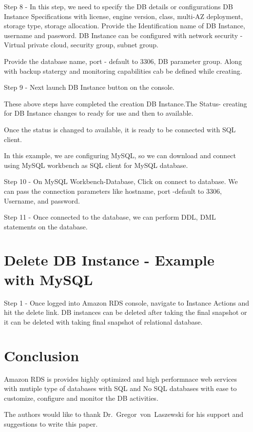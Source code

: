 Step 8 - In this step, we need to specify the DB details or configurations
DB Instance Specifications with license, engine version, class, multi-AZ 
deployment, storage type, storage allocation.
Provide the Identification name of DB Instance, username and password.
DB Instance can be configured with network security - Virtual private 
cloud, security group, subnet group.

Provide the database name, port - default to 3306, DB parameter group. 
Along with backup statergy and monitoring capabilities cab be defined 
while creating.

Step 9 - Next launch DB Instance button on the console.

These above steps have completed the creation DB Instance.The Status- 
creating for DB Instance changes to ready for use and then to available.

Once the status is changed to available, it is ready to be connected 
with SQL client.

In this example, we are configuring MySQL, so we can download and connect 
using MySQL workbench as SQL client for MySQL database. 

Step 10 - On MySQL Workbench-Database, Click on connect to database. We 
can pass the connection parameters like hostname, port -default to 3306, 
Username, and password.

Step 11 - Once connected to the database, we can perform DDL, DML 
statements on the database.

\section{Delete DB Instance - Example with MySQL}

Step 1 - Once logged into Amazon RDS console, navigate to Instance Actions 
and hit the delete link.
DB instances can be deleted after taking the final snapshot or it can be 
deleted with taking final snapshot of relational database.

\section{Conclusion}
Amazon RDS is provides highly optimized and high performnace web services
with mutiple type of databases with SQL and No SQL databases with ease to 
customize, configure and monitor the DB activities.

\begin{acks}
  The authors would like to thank Dr.~Gregor~von~Laszewski for his
  support and suggestions to write this paper.
\end{acks}



 
